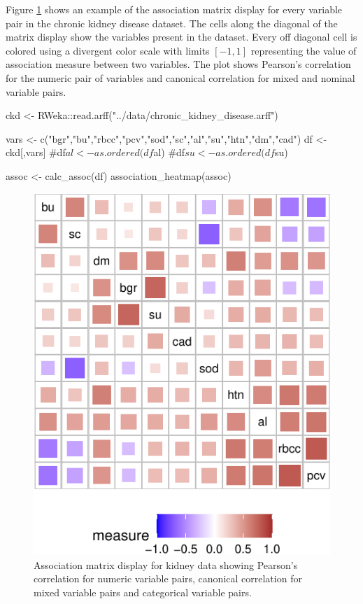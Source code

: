 Figure \ref{fig:assoc-heatmap} shows an example of the association
matrix display for every variable pair in the chronic kidney disease
dataset. The cells along the diagonal of the matrix display show the
variables present in the dataset. Every off diagonal cell is colored
using a divergent color scale with limits \([-1,1]\) representing the
value of association measure between two variables. The plot shows
Pearson's correlation for the numeric pair of variables and canonical
correlation for mixed and nominal variable pairs.

\begin{Schunk}
\begin{Sinput}
ckd <- RWeka::read.arff("../data/chronic_kidney_disease.arff")

vars <- c("bgr","bu","rbcc","pcv","sod","sc","al","su","htn","dm","cad")
df <- ckd[,vars]
#df$al <- as.ordered(df$al)
#df$su <- as.ordered(df$su)

assoc <- calc_assoc(df)
association_heatmap(assoc)
\end{Sinput}
\begin{figure}

{\centering \includegraphics{rj_paper_files/figure-latex/assoc-heatmap-1} 

}

\caption[Association matrix display for kidney data showing Pearson's correlation for numeric variable pairs, canonical correlation for mixed variable pairs and categorical variable pairs]{Association matrix display for kidney data showing Pearson's correlation for numeric variable pairs, canonical correlation for mixed variable pairs and categorical variable pairs.}\label{fig:assoc-heatmap}
\end{figure}
\end{Schunk}

